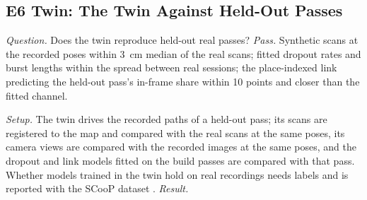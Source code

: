 

\subsection{E6 Twin: The Twin Against Held-Out Passes}
\emph{Question.} Does the twin reproduce held-out real passes?
\emph{Pass.} Synthetic
scans at the recorded poses within \SI{3}{\centi\metre} median of the real
scans; fitted dropout rates and burst lengths within the spread between
real sessions; the place-indexed link predicting the held-out pass's
in-frame share within 10 points and closer than the fitted channel.

\emph{Setup.} The twin drives the recorded paths of a held-out
pass; its scans are registered to the map and compared with the real
scans at the same poses, its camera views are compared with the
recorded images at the same poses, and the dropout and link models fitted on the
build passes are compared with that pass. Whether models trained in
the twin hold on real recordings needs labels and is reported with the
SCooP dataset \cite{scoop_dataset}. \emph{Result.} 

